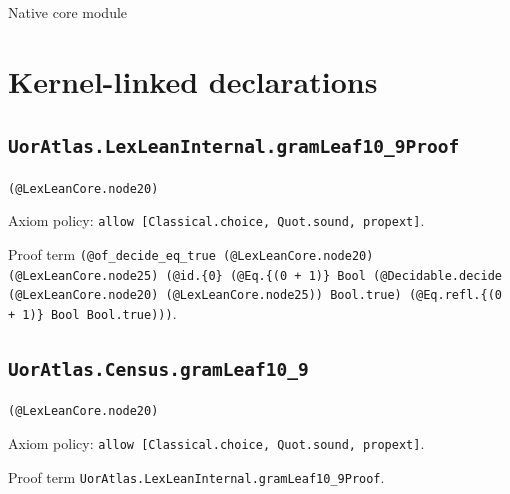 \documentclass[11pt]{article}
\begin{document}
\begin{center}{\LARGE Native core module}\end{center}
\section*{Kernel-linked declarations}
\subsection*{\texttt{UorAtlas.LexLeanInternal.gramLeaf10\_9Proof}}
\noindent\texttt{(@LexLeanCore.node20)}\par
\noindent Axiom policy: \texttt{allow [Classical.choice, Quot.sound, propext]}.\par
\noindent Proof term \texttt{(@of\_decide\_eq\_true (@LexLeanCore.node20) (@LexLeanCore.node25) (@id.\{0\} (@Eq.\{(0 + 1)\} Bool (@Decidable.decide (@LexLeanCore.node20) (@LexLeanCore.node25)) Bool.true) (@Eq.refl.\{(0 + 1)\} Bool Bool.true)))}.\par
\subsection*{\texttt{UorAtlas.Census.gramLeaf10\_9}}
\noindent\texttt{(@LexLeanCore.node20)}\par
\noindent Axiom policy: \texttt{allow [Classical.choice, Quot.sound, propext]}.\par
\noindent Proof term \texttt{UorAtlas.LexLeanInternal.gramLeaf10\_9Proof}.\par
\end{document}
